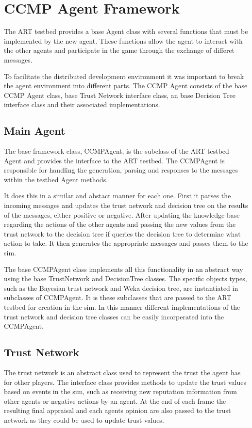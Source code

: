\section{CCMP Agent Framework}
The ART testbed provides a base Agent class with several functions that must be
implemented by the new agent. These functions allow the agent to interact with
the other agents and participate in the game through the exchange of differet
messages.  

To facilitate the distributed development environment it was important to break
the agent environment into different parts.  The CCMP Agent consists of the
base CCMP Agent class, base Trust Network interface class, an base Decision
Tree interface class and their associated implementations.

\subsection{Main Agent}
The base framework class, CCMPAgent, is the subclass of the ART testbed Agent
and provides the interface to the ART testbed.  The CCMPAgent is
responsible for handling the generation, parsing and responses to the
messages within the testbed Agent methods.  

It does this in a similar and abstact manner for each one. First it parses the
incoming messages and updates the trust network and decision tree on the
results of the messages, either positive or negative.  After updating the
knowledge base regarding the actions of the other agents and passing the new
values from the trust network to the decision tree if queries the decision tree
to determine what action to take.  It then generates the appropriate
messages and passes them to the sim.

The base CCMPAgent class implements all this functionality in an abstract way
using the base TrustNetwork and DecisionTree classes.  The specific objects
types, such as the Bayesian trust network and Weka decision tree, are
instantiated in subclasses of CCMPAgent.  It is these subclasses that are passed
to the ART testbed for creation in the sim.  In this manner different
implementations of the trust network and decision tree classes can be easily
incorperated into the CCMPAgent.

\subsection{Trust Network}
The trust network is an abstract class used to represent the trust the agent
has for other players.  The interface class provides methods to update the
trust values based on events in the sim, such as receiving new reputation
information from other agents or negative actions by an agent.  At the end of
each frame the resulting final appraisal and each agents opinion are also
passed to the trust network as they could be used to update trust values.

